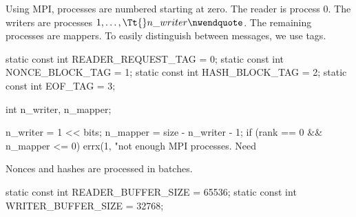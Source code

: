 \documentclass{article}%
\newcommand{\MPI}{\textsf{MPI}\xspace}
\begin{document}
\nwendcode{}Using \MPI, processes are numbered starting at zero. The reader is process
0. The writers are processes $1, \dots, {\Tt{}n{\_}writer\nwendquote}$. The remaining processes
are mappers. To easily distinguish between messages, we use tags.

\nwenddocs{}\plusendmoddef\nwstartdeflinemarkup{}\nwenddeflinemarkup
static const int READER_REQUEST_TAG = 0;
static const int NONCE_BLOCK_TAG = 1;
static const int HASH_BLOCK_TAG = 2;
static const int EOF_TAG = 3;

int n_writer, n_mapper;

\nwendcode{}\endmoddef\nwstartdeflinemarkup{}\nwenddeflinemarkup
n_writer = 1 << bits;
n_mapper = size - n_writer - 1;
if (rank == 0 && n_mapper <= 0)
        errx(1, "not enough MPI processes. Need %

\nwendcode{}Nonces and hashes are processed in batches.

\nwenddocs{}\plusendmoddef\nwstartdeflinemarkup{}\nwenddeflinemarkup
static const int READER_BUFFER_SIZE = 65536;
\nwendcode{}\plusendmoddef\nwstartdeflinemarkup{}\nwenddeflinemarkup
static const int WRITER_BUFFER_SIZE = 32768;
\end{document}
